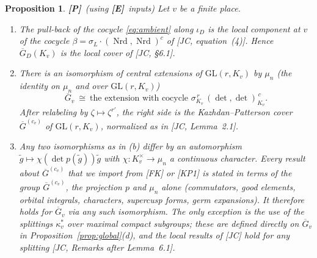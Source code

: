 \documentclass[12pt]{article}
\newcommand{\ov}[1]{\overline{#1}}
\newcommand{\Nrd}{\operatorname{Nrd}}
\newcommand{\GL}{\mathrm{GL}}
\newcommand{\Gb}{\ov{G}}
\newcommand{\GDb}{\ov{G}_D}
\newcommand{\ks}{\kappa^{*}}
\newcommand{\iD}{\iota_D}
\newcommand{\Pv}{\textbf{[P]}}
\newcommand{\Ev}{\textbf{[E]}}
\theoremstyle{plain}
\newtheorem{proposition}[theorem]{Proposition}
\theoremstyle{definition}
\begin{document}
\begin{proposition}\label{prop:restriction}\Pv\ (using \Ev\ inputs)
Let $v$ be a finite place.
\begin{enumerate}[label=(\alph*)]
\item The pull-back of the cocycle \eqref{eq:ambient} along $\iD$ is the local component at $v$ of the cocycle $\beta=\sigma_L\cdot(\Nrd,\Nrd)^c$ of [JC, equation~(4)]. Hence $\GDb(K_v)$ is the local cover of [JC, \S6.1].
\item There is an isomorphism of central extensions of $\GL(r,K_v)$ by $\mu_n$ (the identity on $\mu_n$ and over $\GL(r,K_v)$)
\[ \Gb_v\ \cong\ \text{the extension with cocycle }\sigma_{K_v}^{\,r}\,(\det,\det)_{K_v}^{\,c}. \]
After relabeling by $\zeta\mapsto\zeta^{r'}$, the right side is the Kazhdan--Patterson cover $\Gb^{(c_v)}$ of $\GL(r,K_v)$, normalized as in [JC, Lemma~2.1].
\item Any two isomorphisms as in (b) differ by an automorphism $\tilde g\mapsto\chi(\det p(\tilde g))\tilde g$ with $\chi:K_v^\times\to\mu_n$ a continuous character. Every result about $\Gb^{(c_v)}$ that we import from [FK] or [KP1] is stated in terms of the group $\Gb^{(c_v)}$, the projection $p$ and $\mu_n$ alone (commutators, good elements, orbital integrals, characters, supercusp forms, germ expansions). It therefore holds for $\Gb_v$ via any such isomorphism. The only exception is the use of the splittings $\ks_v$ over maximal compact subgroups; these are defined directly on $\Gb_v$ in Proposition~\ref{prop:global}(d), and the local results of [JC] hold for any splitting [JC, Remarks after Lemma~6.1].
\end{enumerate}
\end{proposition}
\end{document}
